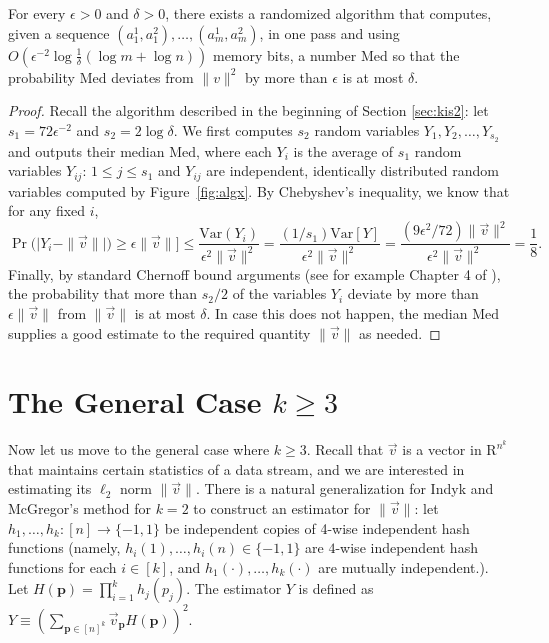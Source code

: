 \def\draft{0}  \documentclass[proceedings]{stacs}
\theoremstyle{plain}\newtheorem{satz}[thm]{Satz}
\theoremstyle{definition}\newtheorem{crucial}[thm]{Crucial Definition}
\newcommand{\vecv}{{\vec{v}} }
\newcommand{\bfp}{{\mathbf p} }
\begin{document}
\begin{theorem}\label{thm:case2} For every $\epsilon > 0$ and $\delta > 0$, there exists a randomized algorithm
that computes, given a sequence $(a^1_1, a^2_1), \dots, (a^1_m, a^2_m)$, in one pass and using $O(\epsilon^{-2}\log \frac 1 \delta(\log m + \log n))$
memory bits, a number $\mathrm{Med}$ so that the probability $\mathrm{Med}$ deviates from $\|v\|^2$ by more than $\epsilon$ is at most $\delta$.
\end{theorem}
\begin{proof}
Recall the algorithm described in the beginning of Section \ref{sec:kis2}: let $s_1 = 72\epsilon^{-2}$ and $s_2 = 2\log \delta$.
We first computes $s_2$ random variables $Y_1, Y_2, \dots, Y_{s_2}$ and
outputs their median $\mathrm{Med}$, where each $Y_i$ is the average of $s_1$ random variables $Y_{ij}$: $1 \leq j \leq s_1$ and $Y_{ij}$ are independent, identically
distributed random variables computed by Figure~\ref{fig:algx}. By Chebyshev's inequality, we know that for any fixed $i$,
\begin{displaymath}
\Pr \big (\big | Y_i - \| \vec v \| \big | \big ) \geq \epsilon \|\vec v\|] \leq \frac{\mathrm{Var}(Y_i)}{\epsilon^2 \|\vec v\|^2} = \frac{(1/s_1)\mathrm{Var}[Y]}{\epsilon^2\|\vec v\|^2}
= \frac{(9\epsilon^2/72) \|\vec v\|^2}{\epsilon^2 \|\vec v\|^2} = \frac 1 8.
\end{displaymath}
Finally, by standard Chernoff bound arguments (see for example Chapter 4 of \cite{MU05}), the probability that more than $s_2/2$
of the variables $Y_i$ deviate by more than $\epsilon\|\vec v\|$ from $\|\vec v\|$ is at most $\delta$. In case this does not happen,
the median $\mathrm{Med}$ supplies a good estimate to the required quantity $\|\vec v\|$ as needed.
\end{proof}


\section{The General Case $k\geq 3$}\label{sec:estimator}

Now let us move to the general case where $k \geq 3$. Recall that $\vecv$ is a vector in $\mathrm R^{n^k}$ that maintains certain statistics of a data stream, and we are interested in estimating its $\ell_2$ norm $\|\vecv\|$. There is a natural generalization for Indyk and McGregor's method for $k = 2$ to construct an estimator for $\|\vecv\|$: let $h_1,\dots,h_k:[n] \rightarrow \{-1, 1\}$ be independent copies of 4-wise independent hash functions (namely, $h_i(1),\dots,h_i(n) \in \{-1,1\}$ are $4$-wise independent hash functions for each $i\in[k]$, and $h_1(\cdot),\dots,h_k(\cdot)$ are mutually independent.).  Let $H(\bfp) = \prod_{i =1}^k h_j(p_j)$. The estimator $Y$ is defined as $Y \equiv \left(\sum_{\bfp \in [n]^k}\vec v_{\bfp}H(\bfp)\right)^2$.
\end{document}
